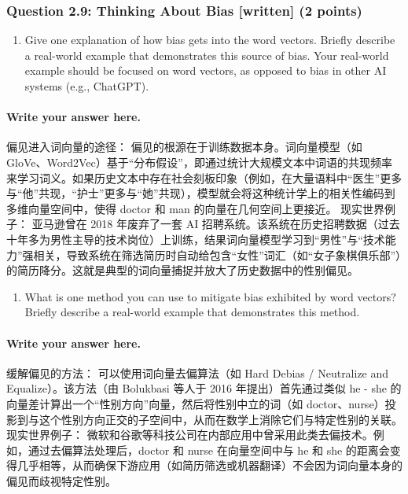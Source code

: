 \documentclass[11pt]{article}
\providecommand{\tightlist}{%
      \setlength{\itemsep}{0pt}\setlength{\parskip}{0pt}}
\begin{document}
    \subsubsection{Question 2.9: Thinking About Bias {[}written{]} (2
points)}\label{question-2.9-thinking-about-bias-written-2-points}

\begin{enumerate}
\def\labelenumi{\alph{enumi}.}
\tightlist
\item
  Give one explanation of how bias gets into the word vectors. Briefly
  describe a real-world example that demonstrates this source of bias.
  Your real-world example should be focused on word vectors, as opposed
  to bias in other AI systems (e.g., ChatGPT).
\end{enumerate}

    \paragraph{Write your answer here.}\label{write-your-answer-here.}

偏见进入词向量的途径： 偏见的根源在于训练数据本身。词向量模型（如
GloVe、Word2Vec）基于``分布假设''，即通过统计大规模文本中词语的共现频率来学习词义。如果历史文本中存在社会刻板印象（例如，在大量语料中``医生''更多与``他''共现，``护士''更多与``她''共现），模型就会将这种统计学上的相关性编码到多维向量空间中，使得
doctor 和 man 的向量在几何空间上更接近。 现实世界例子： 亚马逊曾在 2018
年废弃了一套 AI
招聘系统。该系统在历史招聘数据（过去十年多为男性主导的技术岗位）上训练，结果词向量模型学习到``男性''与``技术能力''强相关，导致系统在筛选简历时自动给包含``女性''词汇（如``女子象棋俱乐部''）的简历降分。这就是典型的词向量捕捉并放大了历史数据中的性别偏见。

    \begin{enumerate}
\def\labelenumi{\alph{enumi}.}
\setcounter{enumi}{1}
\tightlist
\item
  What is one method you can use to mitigate bias exhibited by word
  vectors? Briefly describe a real-world example that demonstrates this
  method.
\end{enumerate}

    \paragraph{Write your answer here.}\label{write-your-answer-here.}

缓解偏见的方法： 可以使用词向量去偏算法（如 Hard Debias / Neutralize and
Equalize）。该方法（由 Bolukbasi 等人于 2016 年提出）首先通过类似 he -
she 的向量差计算出一个``性别方向''向量，然后将性别中立的词（如
doctor、nurse）投影到与这个性别方向正交的子空间中，从而在数学上消除它们与特定性别的关联。
现实世界例子：
微软和谷歌等科技公司在内部应用中曾采用此类去偏技术。例如，通过去偏算法处理后，doctor
和 nurse 在向量空间中与 he 和 she
的距离会变得几乎相等，从而确保下游应用（如简历筛选或机器翻译）不会因为词向量本身的偏见而歧视特定性别。
\end{document}
